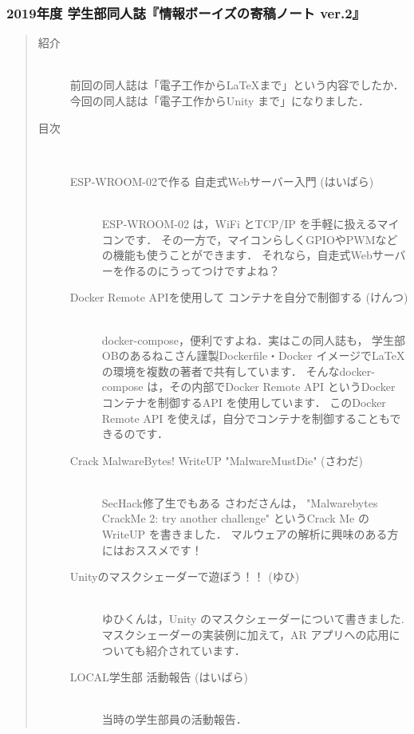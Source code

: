 \subsubsection{2019年度 学生部同人誌『情報ボーイズの寄稿ノート ver.2』}
\begin{quote}
\begin{description}
\item[紹介]\mbox{}\\ 
前回の同人誌は「電子工作から\LaTeX まで」という内容でしたか．
今回の同人誌は「電子工作からUnity まで」になりました．
\item[目次]\mbox{}\\ 
\begin{description}
\item[ESP-WROOM-02で作る 自走式Webサーバー入門 (はいばら)]\mbox{}\\ 
ESP-WROOM-02 は，WiFi とTCP/IP を手軽に扱えるマイコンです．
その一方で，マイコンらしくGPIOやPWMなどの機能も使うことができます．
それなら，自走式Webサーバーを作るのにうってつけですよね？
\item[Docker Remote APIを使用して コンテナを自分で制御する (けんつ)]\mbox{}\\ 
docker-compose，便利ですよね．実はこの同人誌も，
学生部OBのあるねこさん謹製Dockerfile・Docker イメージで\LaTeX の環境を複数の著者で共有しています．
そんなdocker-compose は，その内部でDocker Remote API というDocker コンテナを制御するAPI を使用しています．
このDocker Remote API を使えば，自分でコンテナを制御することもできるのです．
\item[Crack MalwareBytes! WriteUP "MalwareMustDie" (さわだ)]\mbox{}\\ 
SecHack修了生でもある さわださんは，
"Malwarebytes CrackMe 2: try another challenge" というCrack Me のWriteUP を書きました．
マルウェアの解析に興味のある方にはおススメです！
\item[Unityのマスクシェーダーで遊ぼう！！ (ゆひ)]\mbox{}\\ 
ゆひくんは，Unity のマスクシェーダーについて書きました.
マスクシェーダーの実装例に加えて，AR アプリへの応用についても紹介されています．
\item[LOCAL学生部 活動報告 (はいばら)]\mbox{}\\ 
当時の学生部員の活動報告．
\end{description}
\end{description}
\end{quote}